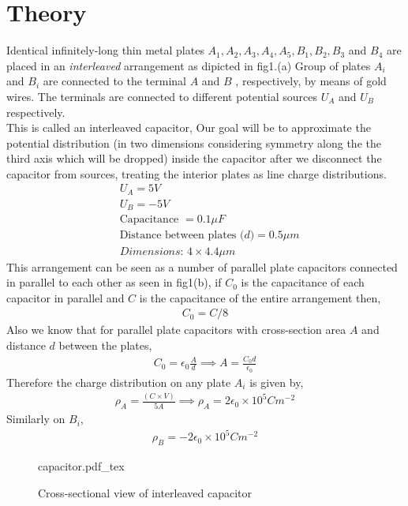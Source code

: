 \section{Theory}
Identical infinitely-long thin metal plates $A_1,A_2,A_3,A_4,A_5,B_1,B_2,B_3 $ and $B_4$ are placed in an \textit{interleaved} arrangement as dipicted in fig1.(a) Group of plates $A_i$ and $B_i$ are connected to the terminal $A$ and $B$ , respectively, by means of gold wires. The terminals are connected to different potential sources $U_A$ and $U_B$ respectively. \\
This is called an interleaved capacitor, Our goal will be to approximate the potential distribution (in two dimensions considering symmetry along the the third axis which will be dropped) inside the capacitor after we disconnect the capacitor from sources, treating the interior plates as line charge distributions.
\begin{align*}
    &U_A = 5V \\
    &U_B = -5V \\
    &\text{Capacitance } = 0.1\mu F\\
    &\text{Distance between plates ($d$)} = 0.5\mu m \\
    &\textit{Dimensions: } 4 \times 4.4 \mu m  
\end{align*}
This arrangement can be seen as a number of parallel plate capacitors connected in parallel to each other as seen in fig1(b),
if $C_0$ is the capacitance of each capacitor in parallel and $C$ is the capacitance of the entire arrangement then,
\begin{align*}
    C_0 = C/8
\end{align*}
Also we know that for parallel plate capacitors with cross-section area $A$ and distance $d$ between the plates,
\begin{align}
    C_0 = \epsilon_0 \frac{A}{d} \implies A = \frac{C_0d}{\epsilon_0}
\end{align}
Therefore the charge distribution on any plate $A_i$ is given by,
\begin{align}
    \rho_A = \frac{(C \times V )}{5A} \implies \rho_A = 2\epsilon_0 \times 10^5C m^{-2} 
\end{align}
Similarly on $B_i$,
\begin{align}
    \rho_B = -2\epsilon_0 \times 10^5C m^{-2} 
\end{align}

\begin{figure}[ht]
    \centering
    \def\svgwidth{0.6\textwidth}
    {capacitor.pdf_tex}
    \caption{Cross-sectional view of interleaved capacitor}
    \label{fig:cap}
\end{figure}

